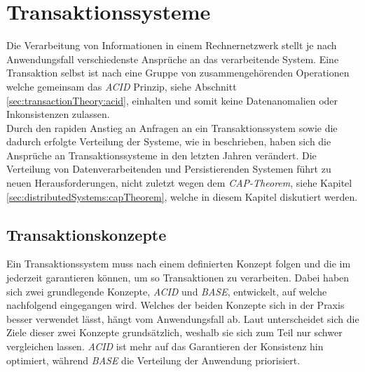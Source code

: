\chapter{Transaktionssysteme} \label{cha:transactionSystems}
Die Verarbeitung von Informationen in einem Rechnernetzwerk stellt je nach Anwendungsfall verschiedenste Ansprüche an das verarbeitende System. Eine Transaktion selbst ist nach \cite{rahm1993HochleistungsTransaktionssysteme} eine Gruppe von zusammengehörenden Operationen welche gemeinsam das \textit{ACID} Prinzip, siehe Abschnitt \ref{sec:transactionTheory:acid}, einhalten und somit keine Datenanomalien oder Inkonsistenzen zulassen. \\
Durch den rapiden Anstieg an Anfragen an ein Transaktionssystem sowie die dadurch erfolgte Verteilung der Systeme, wie in \cite{li2017research} beschrieben, haben sich die Ansprüche an Transaktionssysteme in den letzten Jahren verändert. Die Verteilung von Datenverarbeitenden und Persistierenden Systemen führt zu neuen Herausforderungen, nicht zuletzt wegen dem \textit{CAP-Theorem}, siehe Kapitel \ref{sec:distributedSystems:capTheorem}, welche in diesem Kapitel diskutiert werden. 

\section{Transaktionskonzepte}
Ein Transaktionssystem muss nach \cite{rahm1993HochleistungsTransaktionssysteme} einem definierten Konzept folgen und die im  jederzeit garantieren können, um so Transaktionen zu verarbeiten. Dabei haben sich zwei grundlegende Konzepte, \textit{ACID} und \textit{BASE}, entwickelt, auf welche nachfolgend eingegangen wird. Welches der beiden Konzepte sich in der Praxis besser verwendet lässt, hängt vom Anwendungsfall ab. Laut \cite{EdlichFriedlandHampeBrauer201010}
% 
% 
% 
unterscheidet sich die Ziele dieser zwei Konzepte grundsätzlich, weshalb sie sich zum Teil nur schwer vergleichen lassen.  \textit{ACID} ist mehr auf das Garantieren der Konsistenz hin optimiert, während \textit{BASE} die Verteilung der Anwendung priorisiert.


